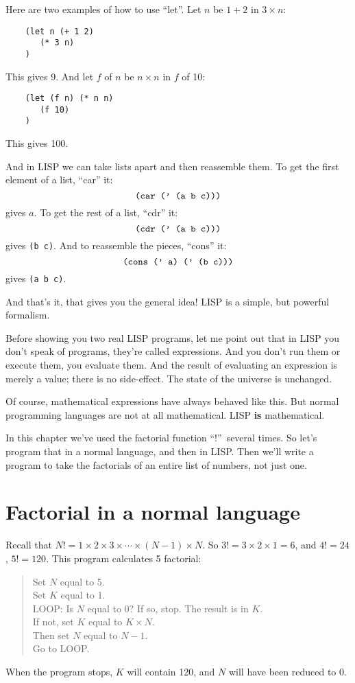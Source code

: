 \documentclass[12pt]{book}
\begin{document}
Here are two examples of how to use ``let''.
Let $n$ be $1 + 2$ in $3 \times n$:
\begin{verbatim}
    (let n (+ 1 2)
       (* 3 n)
    )
\end{verbatim} 
This gives 9. And let $f$ of $n$ be $n \times n$ in $f$ of 10:
\begin{verbatim}
    (let (f n) (* n n)
       (f 10)
    )
\end{verbatim} 
This gives 100.
 
And in LISP we can take lists apart and then reassemble them.
To get the first element of a list, ``car'' it:
\[\mbox{\texttt{
 (car (' (a b c)))
}}\]
gives $a$.
To get the rest of a list, ``cdr'' it:
\[\mbox{\texttt{
 (cdr (' (a b c)))
}}\]
gives \texttt{(b c)}.
And to reassemble the pieces, ``cons'' it:
\[\mbox{\texttt{
 (cons (' a) (' (b c)))
}}\]
gives \texttt{(a b c)}.
 
And that's it, that gives you the general idea! LISP is a simple, but powerful formalism.
 
Before showing you two real LISP programs, let me point 
out that in LISP you don't speak of programs, they're called expressions.
And you don't run them or execute them, you evaluate them.
And the result of evaluating an expression is merely a value; there is no side-effect.
The state of the universe is unchanged.
 
Of course, mathematical expressions have always behaved like this.
But normal programming languages are not at all mathematical.
LISP \textbf{is} mathematical.
 
In this chapter we've used the factorial function ``!''\ several times.
So let's program that in a normal language, and then in LISP.
Then we'll write a program to take the factorials of an entire list of numbers, not just one.

\section*{Factorial in a normal language}

Recall that
$N! = 1 \times 2 \times 3 \times \cdots \times (N - 1) \times N$.
So $3! = 3 \times 2 \times 1 = 6$, and $4! = 24$, $5! = 120$.
This program calculates 5 factorial:
\begin{verse}
Set $N$ equal to 5.
\\
Set $K$ equal to 1.
\vspace{\baselineskip}
\\ 
LOOP: Is $N$ equal to 0? If so, stop. The result is in $K$.
\\
   If not, set $K$ equal to $K \times N$.
\\
   Then set $N$ equal to $N - 1$.
\\
   Go to LOOP.  
\end{verse}
When the program stops, $K$ will contain 120,
and $N$ will have been reduced to 0.
\end{document}
